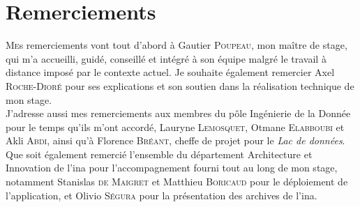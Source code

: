 	\chapter*{Remerciements}
	
	\lettrine{M}es remerciements vont tout d'abord à Gautier \textsc{Poupeau}, mon maître de stage, qui m'a accueilli, guidé, conseillé et intégré à son équipe malgré le travail à distance imposé par le contexte actuel. Je souhaite également remercier Axel \textsc{Roche-Dioré} pour ses explications et son soutien dans la réalisation technique de mon stage.\\
	
	J'adresse aussi mes remerciements aux membres du pôle \og Ingénierie de la Donnée\fg{} pour le temps qu'ils m'ont accordé, Lauryne \textsc{Lemosquet}, Otmane \textsc{Elabboubi} et Akli \textsc{Abdi}, ainsi qu'à Florence \textsc{Bréant}, cheffe de projet pour le \textit{Lac de données}. \\
	
	Que soit également remercié l'ensemble du département \og Architecture et Innovation\fg{} de l'\ac{ina} pour l'accompagnement fourni tout au long de mon stage, notamment Stanislas \textsc{de Maigret} et Matthieu \textsc{Boricaud} pour le déploiement de l'application, et Olivio \textsc{Ségura} pour la présentation des archives de l'\ac{ina}.